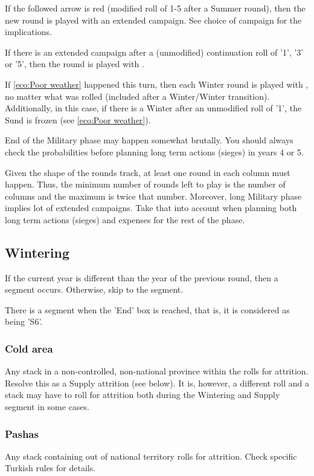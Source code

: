 If the followed arrow is red (modified roll of 1-5 after a Summer round), then
the new round is played with an extended campaign. See choice of campaign for
the implications.

If there is an extended campaign after a (unmodified) continuation roll of
'1', '3' or '5', then the round is played with .

If \ref{eco:Poor weather} happened this turn, then each Winter round is played
with , no matter what was rolled (included after a
Winter/Winter transition). Additionally, in this case, if there is a Winter
after an unmodified roll of '1', the Sund is frozen (see \ref{eco:Poor
  weather}).

\begin{playtip}
  End of the Military phase may happen somewhat brutally. You should always
  check the probabilities before planning long term actions (sieges) in years
  4 or 5.

  Given the shape of the rounds track, at least one round in each column must
  happen. Thus, the minimum number of rounds left to play is the number of
  columns and the maximum is twice that number. Moreover, long Military phase
  implies lot of extended campaigns. Take that into account when planning both
  long term actions (sieges) and expenses for the rest of the phase.
\end{playtip}

\subsection{Wintering}
\label{chMilitary:Rounds:Wintering}
If the current year is different than the year of the previous round, then a
 segment occurs. Otherwise, skip to the 
segment.

There is a  segment when the 'End' box is reached, that is,
it is considered as being 'S6'.

\subsubsection{Cold area}
Any stack in a non-controlled, non-national province within the  rolls for attrition. Resolve this as a Supply attrition (see
below). It is, however, a different roll and a stack may have to roll for
attrition both during the Wintering and Supply segment in some cases.

\subsubsection{Pashas}
Any stack containing \Timar out of \TUR national territory rolls for
attrition. Check specific Turkish rules for details.

